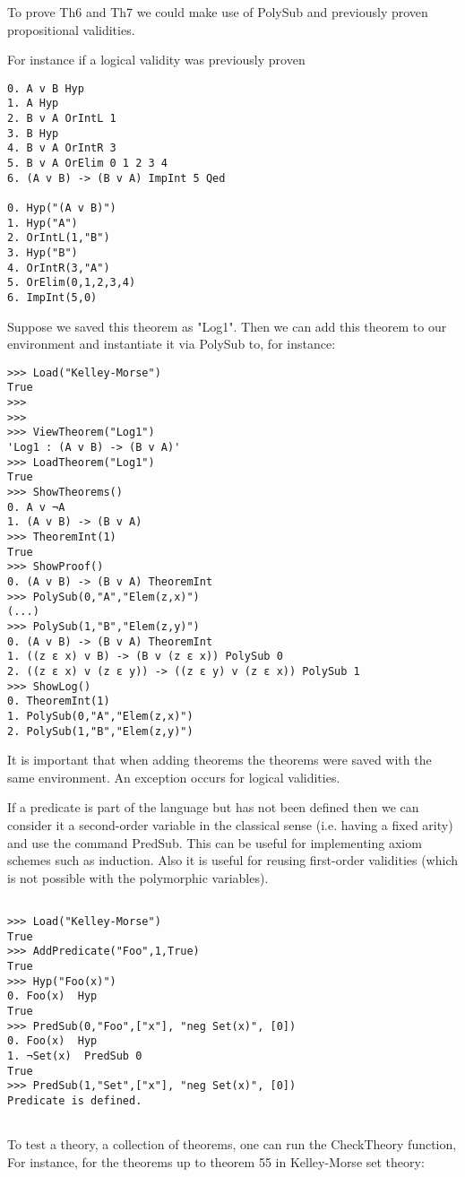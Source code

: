 \documentclass[12pt,leqno]{article}
\numberwithin{equation}{section}
\begin{document}
To prove Th6 and Th7 we could make use of PolySub and previously proven propositional validities.

For instance if a logical validity was previously proven

\begin{verbatim}
0. A v B Hyp 
1. A Hyp 
2. B v A OrIntL 1
3. B Hyp 
4. B v A OrIntR 3
5. B v A OrElim 0 1 2 3 4
6. (A v B) -> (B v A) ImpInt 5 Qed

0. Hyp("(A v B)")
1. Hyp("A")
2. OrIntL(1,"B")
3. Hyp("B")
4. OrIntR(3,"A")
5. OrElim(0,1,2,3,4)
6. ImpInt(5,0)
\end{verbatim}

Suppose we saved this theorem as "Log1".
Then we can add this theorem to our environment
and instantiate it via PolySub to, for instance:

\begin{verbatim}
>>> Load("Kelley-Morse")
True
>>> 
>>> 
>>> ViewTheorem("Log1")
'Log1 : (A v B) -> (B v A)'
>>> LoadTheorem("Log1")
True
>>> ShowTheorems()
0. A v ¬A 
1. (A v B) -> (B v A) 
>>> TheoremInt(1)
True
>>> ShowProof()
0. (A v B) -> (B v A) TheoremInt 
>>> PolySub(0,"A","Elem(z,x)")
(...)
>>> PolySub(1,"B","Elem(z,y)")
0. (A v B) -> (B v A) TheoremInt 
1. ((z ε x) v B) -> (B v (z ε x)) PolySub 0
2. ((z ε x) v (z ε y)) -> ((z ε y) v (z ε x)) PolySub 1
>>> ShowLog()
0. TheoremInt(1)
1. PolySub(0,"A","Elem(z,x)")
2. PolySub(1,"B","Elem(z,y)")
\end{verbatim}
 It is important that when adding theorems the theorems were saved with the same environment. An exception occurs for logical validities.


If a predicate is part of the language but has not been defined then we can consider it a second-order variable in the classical sense (i.e. having a fixed arity) and
use the command PredSub. This can  be useful for implementing axiom schemes such as induction.  Also it is useful for reusing first-order validities (which is not possible with the polymorphic variables).

\begin{verbatim}
	
>>> Load("Kelley-Morse")
True
>>> AddPredicate("Foo",1,True)
True
>>> Hyp("Foo(x)")
0. Foo(x)  Hyp 
True
>>> PredSub(0,"Foo",["x"], "neg Set(x)", [0])
0. Foo(x)  Hyp 
1. ¬Set(x)  PredSub 0
True
>>> PredSub(1,"Set",["x"], "neg Set(x)", [0])
Predicate is defined.	
	
\end{verbatim}

To test a theory, a collection of theorems, one can run the CheckTheory function,
For instance, for the theorems up to theorem 55 in Kelley-Morse  set theory:
\end{document}
